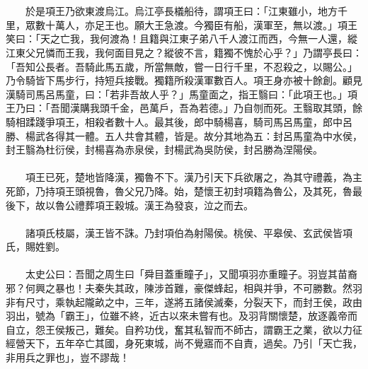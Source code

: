 \\\\
　　於是項王乃欲東渡烏江。烏江亭長檥船待，謂項王曰：「江東雖小，地方千里，眾數十萬人，亦足王也。願大王急渡。今獨臣有船，漢軍至，無以渡。」項王笑曰：「天之亡我，我何渡為！且籍與江東子弟八千人渡江而西，今無一人還，縱江東父兄憐而王我，我何面目見之？縱彼不言，籍獨不愧於心乎？」乃謂亭長曰：「吾知公長者。吾騎此馬五歲，所當無敵，嘗一日行千里，不忍殺之，以賜公。」乃令騎皆下馬步行，持短兵接戰。獨籍所殺漢軍數百人。項王身亦被十餘創。顧見漢騎司馬呂馬童，曰：「若非吾故人乎？」馬童面之，指王翳曰：「此項王也。」項王乃曰：「吾聞漢購我頭千金，邑萬戶，吾為若德。」乃自刎而死。王翳取其頭，餘騎相蹂踐爭項王，相殺者數十人。最其後，郎中騎楊喜，騎司馬呂馬童，郎中呂勝、楊武各得其一體。五人共會其體，皆是。故分其地為五：封呂馬童為中水侯，封王翳為杜衍侯，封楊喜為赤泉侯，封楊武為吳防侯，封呂勝為涅陽侯。
\\\\
　　項王已死，楚地皆降漢，獨魯不下。漢乃引天下兵欲屠之，為其守禮義，為主死節，乃持項王頭視魯，魯父兄乃降。始，楚懷王初封項籍為魯公，及其死，魯最後下，故以魯公禮葬項王穀城。漢王為發哀，泣之而去。
\\\\
　　諸項氏枝屬，漢王皆不誅。乃封項伯為射陽侯。桃侯、平皋侯、玄武侯皆項氏，賜姓劉。
\\\\
　　太史公曰：吾聞之周生曰「舜目蓋重瞳子」，又聞項羽亦重瞳子。羽豈其苗裔邪？何興之暴也！夫秦失其政，陳涉首難，豪傑蜂起，相與并爭，不可勝數。然羽非有尺寸，乘執起隴畝之中，三年，遂將五諸侯滅秦，分裂天下，而封王侯，政由羽出，號為「霸王」，位雖不終，近古以來未嘗有也。及羽背關懷楚，放逐義帝而自立，怨王侯叛己，難矣。自矜功伐，奮其私智而不師古，謂霸王之業，欲以力征經營天下，五年卒亡其國，身死東城，尚不覺寤而不自責，過矣。乃引「天亡我，非用兵之罪也」，豈不謬哉！
